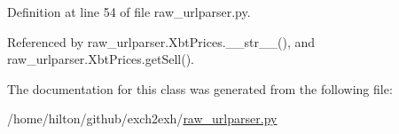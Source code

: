 Definition at line 54 of file raw\-\_\-urlparser.\-py.



Referenced by raw\-\_\-urlparser.\-Xbt\-Prices.\-\_\-\-\_\-str\-\_\-\-\_\-(), and raw\-\_\-urlparser.\-Xbt\-Prices.\-get\-Sell().



The documentation for this class was generated from the following file\-:\begin{DoxyCompactItemize}
\item 
/home/hilton/github/exch2exh/\hyperlink{raw__urlparser_8py}{raw\-\_\-urlparser.\-py}\end{DoxyCompactItemize}
